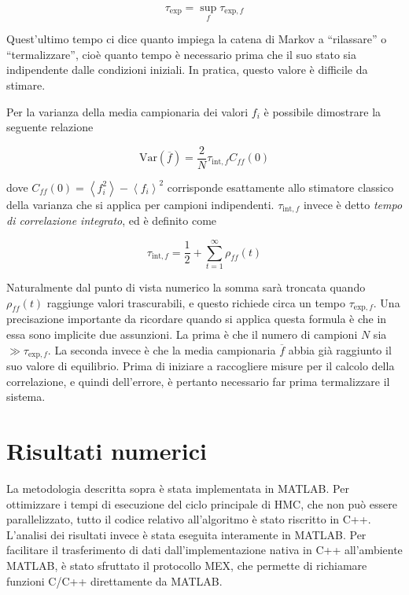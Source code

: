 \documentclass[11pt, a4paper]{article}
\begin{document}
\begin{equation}
  \tau_{\mathrm{exp}} = \sup_{f} \tau_{\mathrm{exp},f}
\end{equation}

Quest'ultimo tempo ci dice quanto impiega la catena di Markov a ``rilassare'' o ``termalizzare'', cioè quanto tempo è necessario prima che il suo stato sia indipendente dalle condizioni iniziali.
In pratica, questo valore è difficile da stimare.


Per la varianza della media campionaria dei valori $f_i$ è possibile dimostrare la seguente relazione

\begin{equation}
  \mathrm{Var}(\overline{f}) = \frac{2}{N} \tau_{\mathrm{int},f} C_{ff}(0)
\end{equation}

dove $C_{ff}(0) = \left\langle f_i ^2 \right\rangle - \left\langle f_i \right\rangle ^ 2$ corrisponde esattamente allo stimatore classico della varianza che si applica per campioni indipendenti.
$\tau_{\mathrm{int},f}$ invece è detto \emph{tempo di correlazione integrato}, ed è definito come

\begin{equation}
  \tau_{\mathrm{int},f} = \frac{1}{2} + \sum_{t=1}^{\infty} \rho_{ff}(t)
\end{equation}

Naturalmente dal punto di vista numerico la somma sarà troncata quando $\rho_{ff}(t)$ raggiunge valori trascurabili, e questo richiede circa un tempo $\tau_{\mathrm{exp},f}$.
Una precisazione importante da ricordare quando si applica questa formula è che in essa sono implicite due assunzioni.
La prima è che il numero di campioni $N$ sia $\gg  \tau_{\mathrm{exp},f}$. La seconda invece è che la media campionaria $\overline{f}$ abbia già raggiunto il suo valore di equilibrio.
Prima di iniziare a raccogliere misure per il calcolo della correlazione, e quindi dell'errore, è pertanto necessario far prima termalizzare il sistema.


\section{Risultati numerici}

La metodologia descritta sopra è stata implementata in MATLAB. Per ottimizzare i tempi di esecuzione del ciclo principale di HMC, che non può essere parallelizzato, tutto il codice relativo all'algoritmo è stato riscritto in C++.
L'analisi dei risultati invece è stata eseguita interamente in MATLAB. Per facilitare il trasferimento di dati dall'implementazione nativa in C++ all'ambiente MATLAB, è stato sfruttato il protocollo MEX, che permette di richiamare funzioni C/C++ direttamente da MATLAB.
\end{document}
